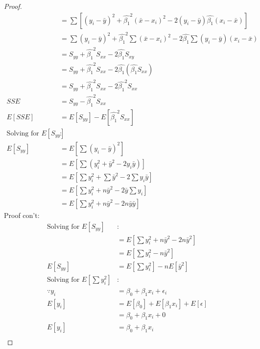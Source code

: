\documentclass[12pt]{article}
\begin{document}
\begin{enumerate}[1.]
\begin{enumerate}[(a)]
\begin{proof}
\begin{align*}
                    &= \sum [(y_i - \bar{y})^2 + \hat{\beta_1}^2 (\bar{x} - x_i)^2 - 2(y_i - \bar{y})\hat{\beta_1}(x_i - \bar{x})] \\
                    &= \sum(y_i - \bar{y})^2 + \hat{\beta_1}^2 \sum(\bar{x} - x_i)^2 - 2\hat{\beta_1}\sum(y_i - \bar{y})(x_i - \bar{x}) \\
                    &= S_{yy} + \hat{\beta_1}^2 S_{xx} - 2 \hat{\beta_1} S_{xy} \\
                    &= S_{yy} + \hat{\beta_1}^2 S_{xx} - 2 \hat{\beta_1}(\hat{\beta_1}S_{xx})\\
                    &= S_{yy} + \hat{\beta_1}^2 S_{xx} - 2 \hat{\beta_1}^2 S_{xx}\\
                    SSE &= S_{yy} - \hat{\beta_1}^2 S_{xx} \\
                    E[SSE] &= E[S_{yy}] - E[\hat{\beta_1}^2 S_{xx}] \\
                    \text{Solving for $E[S_{yy}]$} &:\\
                    E[S_{yy}] &= E[\sum (y_i - \bar{y})^2] \\
                    &= E[\sum (y_i^2 + \bar{y}^2 - 2y_i\bar{y})] \\
                    &= E[\sum y_i^2 + \sum \bar{y}^2 - 2\sum y_i\bar{y}] \\
                    &= E[\sum y_i^2 + n \bar{y}^2 - 2 \bar{y} \sum y_i] \\
                    &= E[\sum y_i^2 + n \bar{y}^2 - 2 n \bar{y} \bar{y}]
                \end{align*}
                Proof con't:
                \begin{align*}
                    \text{Solving for $E[S_{yy}]$} &:\\
                    &= E[\sum y_i^2 + n \bar{y}^2 - 2 n \bar{y}^2] \\
                    &= E[\sum y_i^2 - n \bar{y}^2] \\
                    E[S_{yy}] &= E[\sum y_i^2] - n E[\bar{y}^2] \\
                    \text{Solving for $E[\sum y_i^2]$} &: \\
                    \because y_i &= \beta_0 + \beta_1 x_i + \epsilon_i \\
                    E[y_i] &= E[\beta_0] + E[\beta_1 x_i] + E[\epsilon] \\
                    &= \beta_0 + \beta_1 x_i + 0 \\
                    E[y_i] &= \beta_0 + \beta_1 x_i \\

\end{align*}
\end{proof}
\end{enumerate}
\end{enumerate}
\end{document}
